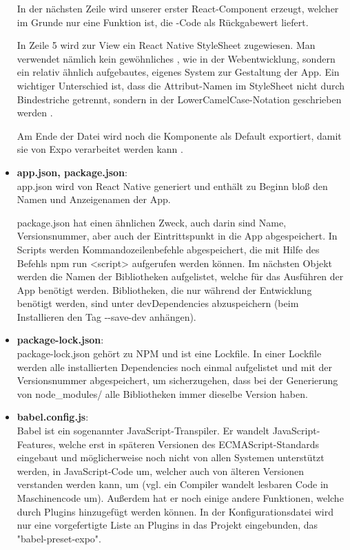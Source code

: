 \begin{itemize}
In der nächsten Zeile wird unserer erster React-Component erzeugt, welcher im Grunde nur eine
Funktion ist, die -Code als Rückgabewert liefert.

In Zeile 5 wird zur View ein React Native StyleSheet zugewiesen. Man verwendet nämlich kein
gewöhnliches , wie in der Webentwicklung, sondern ein relativ ähnlich aufgebautes,
eigenes System zur Gestaltung der App. Ein wichtiger Unterschied ist, dass die Attribut-Namen im
StyleSheet nicht durch Bindestriche getrennt, sondern in der LowerCamelCase-Notation geschrieben
werden \cite{camelCaseNotation}.

Am Ende der Datei wird noch die Komponente als Default exportiert, damit sie von Expo verarbeitet
werden kann \cite{jsModules}.

\item \textbf{app.json, package.json}:\\
app.json wird von React Native generiert und enthält zu Beginn bloß den Namen und Anzeigenamen der
App.


package.json hat einen ähnlichen Zweck, auch darin sind Name, Versionsnummer, aber auch der
Eintrittspunkt in die App abgespeichert. In Scripts werden Kommandozeilenbefehle abgespeichert, die
mit Hilfe des Befehls npm run <script> aufgerufen werden können. Im nächsten Objekt werden die
Namen der Bibliotheken aufgelistet, welche für das Ausführen der App benötigt werden. Bibliotheken,
die nur während der Entwicklung benötigt werden, sind unter devDependencies abzuspeichern (beim
Installieren den Tag -{}-save-dev anhängen).

\item \textbf{package-lock.json}:\\
package-lock.json gehört zu NPM und ist eine Lockfile. In einer Lockfile werden alle installierten
Dependencies noch einmal aufgelistet und mit der Versionsnummer abgespeichert, um sicherzugehen,
dass bei der Generierung von node\_modules/ alle Bibliotheken immer dieselbe Version haben.

\item \textbf{babel.config.js}:\\
Babel ist ein sogenannter JavaScript-Transpiler. Er wandelt JavaScript-Features, welche erst in
späteren Versionen des ECMAScript-Standards eingebaut und möglicherweise noch nicht von allen
Systemen unterstützt werden, in JavaScript-Code um, welcher auch von älteren Versionen verstanden
werden kann, um (vgl. ein Compiler wandelt lesbaren Code in Maschinencode um). Außerdem hat er noch
einige andere Funktionen, welche durch Plugins hinzugefügt werden können. In der Konfigurationsdatei
wird nur eine vorgefertigte Liste an Plugins in das Projekt eingebunden, das "babel-preset-expo".


\end{itemize}
